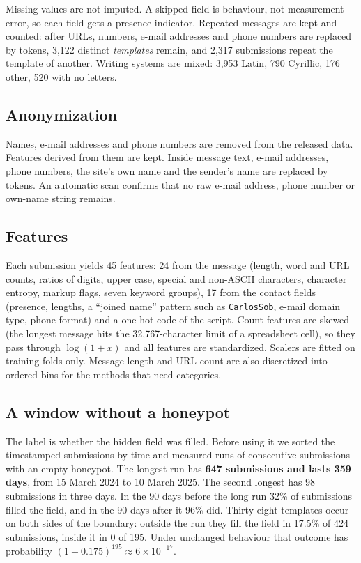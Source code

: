 \documentclass[conference]{IEEEtran}
\begin{document}
Missing values are not imputed. A skipped field is behaviour, not measurement error, so each field gets a
presence indicator. Repeated messages are kept and counted: after URLs, numbers, e-mail addresses and phone
numbers are replaced by tokens, 3,122 distinct \emph{templates} remain, and 2,317 submissions repeat the
template of another. Writing systems are mixed: 3,953 Latin, 790 Cyrillic, 176 other, 520 with no letters.

\subsection{Anonymization}

Names, e-mail addresses and phone numbers are removed from the released data. Features derived from them are
kept. Inside message text, e-mail addresses, phone numbers, the site's own name and the sender's name are
replaced by tokens. An automatic scan confirms that no raw e-mail address, phone number or own-name string
remains.

\subsection{Features}

Each submission yields 45 features: 24 from the message (length, word and URL counts, ratios of digits, upper
case, special and non-ASCII characters, character entropy, markup flags, seven keyword groups), 17 from the
contact fields (presence, lengths, a ``joined name'' pattern such as \texttt{CarlosSob}, e-mail domain type,
phone format) and a one-hot code of the script. Count features are skewed (the longest message hits the
32,767-character limit of a spreadsheet cell), so they pass through $\log(1+x)$ and all features are
standardized. Scalers are fitted on training folds only. Message length and URL count are also discretized
into ordered bins for the methods that need categories.

\subsection{A window without a honeypot}
\label{sec:window}

The label is whether the hidden field was filled. Before using it we sorted the timestamped submissions by
time and measured runs of consecutive submissions with an empty honeypot. The longest run has \textbf{647
submissions and lasts 359 days}, from 15 March 2024 to 10 March 2025. The second longest has 98 submissions in
three days. In the 90 days before the long run 32\% of submissions filled the field, and in the 90 days after
it 96\% did. Thirty-eight templates occur on both sides of the boundary: outside the run they fill the field
in 17.5\% of 424 submissions, inside it in 0 of 195. Under unchanged behaviour that outcome has probability
$(1-0.175)^{195} \approx 6 \times 10^{-17}$.
\end{document}
